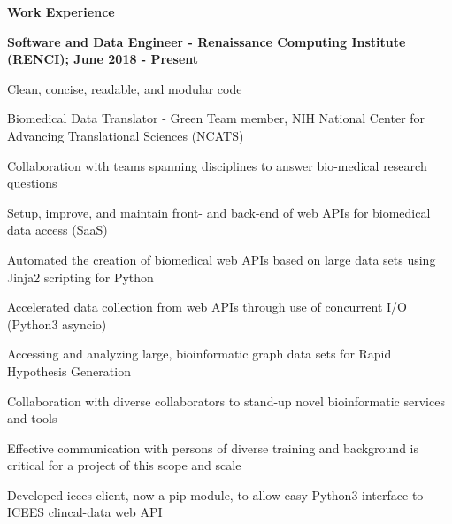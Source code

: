 \documentclass[letterpaper,final]{memoir}
\newcommand{\LargeSep}{\vspace{1.3em}}
\newcommand{\Sep}{\vspace{1.0em}}
\newcommand{\SmallSep}{\vspace{0.4em}}
\newcommand{\CVSection}[1]
	{\LARGE\textbf{#1}\par
	\SmallSep\normalsize}
\newcommand{\CVItem}[1]
	{\textbf{\color{Blue} #1}}
\begin{document}
\LargeSep


\notoserif \CVSection{Work Experience}
\normalfont

\Sep

\CVItem{Software and Data Engineer - Renaissance Computing Institute (RENCI); June 2018 - Present}
\begin{compactitem}[\color{Blue}$\circ$]
    
    \SmallSep
    \item Clean, concise, readable, and modular code
    
    \item Biomedical Data Translator - Green Team member, NIH National Center for Advancing Translational Sciences (NCATS)
    
    \item Collaboration with teams spanning disciplines to answer bio-medical research questions
    
    \item Setup, improve, and maintain front- and back-end of web APIs for biomedical data access (SaaS)
    
    \item Automated the creation of biomedical web APIs based on large data sets using Jinja2 scripting for Python
    
    \item Accelerated data collection from web APIs through use of concurrent I/O (Python3 asyncio)
    
    \item Accessing and analyzing large, bioinformatic graph data sets for Rapid Hypothesis Generation
    
    \item Collaboration with diverse collaborators to stand-up novel bioinformatic services and tools
    
    \item Effective communication with persons of diverse training and background is critical for a project of this scope and scale
    
    \item Developed icees-client, now a pip module, to allow easy Python3 interface to ICEES clincal-data web API    

\end{compactitem}

\Sep
\end{document}
